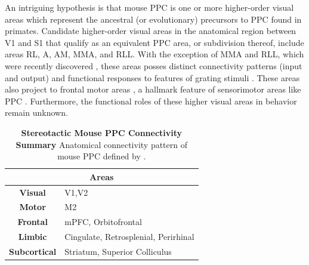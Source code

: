 An intriguing hypothesis is that mouse PPC is one or more higher-order visual areas which represent the ancestral (or evolutionary) precursors to PPC found in primates. Candidate higher-order visual areas in the anatomical region between V1 and S1 that qualify as an equivalent PPC area, or subdivision thereof, include areas RL, A, AM, MMA, and RLL. With the exception of MMA and RLL, which were recently discovered \parencite{Zhuang2017}, these areas posses distinct connectivity patterns (input and output) and functional responses to features of grating stimuli \parencite{Andermann2011,Marshel2011,Juavinett2015,Tohmi2014}. These areas also project to frontal motor areas \parencite{Wang2012}, a hallmark feature of sensorimotor areas like PPC \parencite{Kaas2011a}. Furthermore, the functional roles of these higher visual areas in behavior remain unknown. \par

\begin{table}
\centering
\begin{tabular}{cl}
\hline
\multicolumn{2}{c}{Areas} \\ \hline
\textbf{Visual} & V1,V2 \\
\textbf{Motor} & M2 \\
\textbf{Frontal} & mPFC, Orbitofrontal \\
\textbf{Limbic} & Cingulate, Retrosplenial, Perirhinal \\
\textbf{Subcortical} & Striatum, Superior Colliculus \\ \hline
\end{tabular}
\caption[Stereotactic Mouse PPC Connectivity Summary]{\textbf{Stereotactic Mouse PPC Connectivity Summary} Anatomical connectivity pattern of mouse PPC defined by \textcite{Harvey2012}.}
\label{table:harveyPPC}
\end{table}

